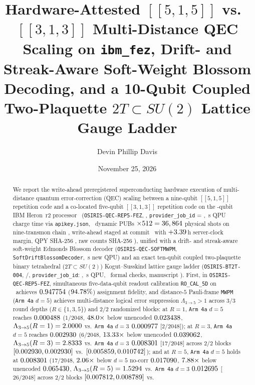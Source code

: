 \documentclass[aps,prx,twocolumn,superscriptaddress,nofootinbib]{revtex4-2}
\begin{document}
\title{Hardware-Attested $[[5,1,5]]$ vs.\ $[[3,1,3]]$ Multi-Distance QEC Scaling on \texttt{ibm\_fez}, Drift- and Streak-Aware Soft-Weight Blossom Decoding, and a 10-Qubit Coupled Two-Plaquette $2T \subset SU(2)$ Lattice Gauge Ladder}

\author{Devin Phillip Davis}
\date{November 25, 2026}

\begin{abstract}
We report the write-ahead preregistered superconducting hardware execution of multi-distance quantum error-correction (QEC) scaling between a nine-qubit $[[5,1,5]]$ repetition code and a co-located five-qubit $[[3,1,3]]$ repetition code on the \rfsHeronQubits-qubit IBM Heron~r2 processor \rfsBackend\ (\texttt{OSIRIS-QEC-REP5-FEZ}, \rfsHwTier, \texttt{provider\_job\_id} = \rfsRepFiveJobId, \rfsRepFiveQpuSec\,s QPU charge time via \texttt{apikey.json}, \rfsRepFiveTotalPubs\ dynamic PUBs $\times 512 = 36,864$ physical shots on nine-transmon chain \rfsRepFiveChain, write-ahead staged at commit \rfsRepFiveStagedCommit\ with $+3.39$\,h server-clock margin, QPY SHA-256 \rfsRepFiveQpyShaPrefix, raw counts SHA-256 \rfsRepFiveRawGzShaPrefix), unified with a drift- and streak-aware soft-weight Edmonds Blossom decoder (\texttt{OSIRIS-QEC-SOFTMWPM}, \texttt{SoftDriftBlossomDecoder}, \rfsSimQpuSec\,s new QPU) and an exact ten-qubit coupled two-plaquette binary tetrahedral ($2T \subset SU(2)$) Kogut--Susskind lattice gauge ladder (\texttt{OSIRIS-BT2T-004}, \rfsSimTier/\rfsProxyTier, \texttt{provider\_job\_id}: \rfsSimJobId, \rfsSimQpuSec\,s QPU, \rfsBtFormalChecks\ formal checks, manuscript \rfsPaperId). First, in \texttt{OSIRIS-QEC-REP5-FEZ}, simultaneous five-data-qubit readout calibration \texttt{RO\_CAL\_5D} on \rfsRepFiveDataChain\ achieves $0.947754$ ($94.78\%$) assignment fidelity, and distance-$5$ Pauli-frame \texttt{MWPM} (\texttt{Arm 4a} $d=5$) achieves multi-distance logical error suppression $\Lambda_{3\to 5} > 1$ across $3/3$ round depths ($R \in \{1, 3, 5\}$) and $2/2$ randomized blocks: at $R = 1$, \texttt{Arm 4a} $d=5$ reaches $0.000488$ ($1/2048$, $48.0\times$ below unencoded $0.023438$, $\Lambda_{3\to 5}(R=1) = 2.0000$ vs.\ \texttt{Arm 4a} $d=3$ $0.000977$ [$2/2048$]); at $R = 3$, \texttt{Arm 4a} $d=5$ reaches $0.002930$ ($6/2048$, $13.33\times$ below unencoded $0.039062$, $\Lambda_{3\to 5}(R=3) = 2.8333$ vs.\ \texttt{Arm 4a} $d=3$ $0.008301$ [$17/2048$] across $2/2$ blocks $[0.002930, 0.002930]$ vs.\ $[0.005859, 0.010742]$); and at $R = 5$, \texttt{Arm 4a} $d=5$ holds at $0.008301$ ($17/2048$, $2.06\times$ below $d=5$ no-corr $0.017090$, $7.88\times$ below unencoded $0.065430$, $\Lambda_{3\to 5}(R=5) = 1.5294$ vs.\ \texttt{Arm 4a} $d=3$ $0.012695$ [$26/2048$] across $2/2$ blocks $[0.007812, 0.008789]$ vs.\ 
\end{abstract}
\end{document}
